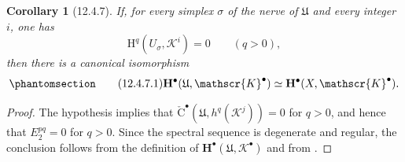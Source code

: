 \documentclass[oneside]{amsart}
\theoremstyle{ega-env-style}
\theoremstyle{ega-thm-env-style}
\newtheorem*{corollary}{Corollary}
\theoremstyle{ega-defn-env-style}
\def\mathcal{\mathscr}
\def\sh{\mathcal}                   %
\def\bb{\mathbf}                    %
\def\HH{\mathrm{H}}                 %
\def\isoto{\simeq} %
\let\EGAOriginalLabel\label
\renewcommand{\label}[1]{\phantomsection\EGAOriginalLabel{#1}}
\begin{document}
\begin{corollary}[12.4.7]
\label{0.12.4.7}
If, for every simplex $\sigma$ of the nerve of $\mathfrak{U}$ and
every integer $i$, one has
\[
  \HH^q(U_\sigma,\sh{K}^i)=0
  \qquad(q>0),
\]
then there is a canonical isomorphism
\begin{equation}
\label{0.12.4.7.1}
\tag{12.4.7.1}
  \bb{H}^\bullet(\mathfrak{U},\sh{K}^\bullet)
  \isoto
  \bb{H}^\bullet(X,\sh{K}^\bullet).
\end{equation}
\end{corollary}

\begin{proof}
The hypothesis implies that
$\check{\mathrm{C}}^\bullet
(\mathfrak{U},h^q(\sh{K}^j))=0$ for $q>0$, and hence that
$E_2^{pq}=0$ for $q>0$.
Since the spectral sequence  is degenerate and
regular, the conclusion follows from the definition
 of
$\bb{H}^\bullet(\mathfrak{U},\sh{K}^\bullet)$ and from
.
\end{proof}
\end{document}
